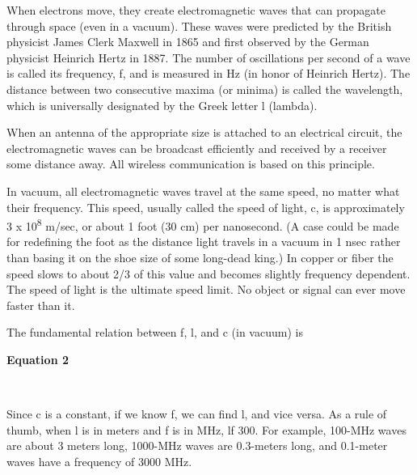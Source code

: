When electrons move, they create electromagnetic waves that can
propagate through space (even in a vacuum). These waves were predicted
by the British physicist James Clerk Maxwell in 1865 and first observed
by the German physicist Heinrich Hertz in 1887. The number of
oscillations per second of a wave is called its {frequency}, {f}, and is
measured in {Hz} (in honor of Heinrich Hertz). The distance between two
consecutive maxima (or minima) is called the {wavelength}, which is
universally designated by the Greek letter {l} (lambda).

When an antenna of the appropriate size is attached to an electrical
circuit, the electromagnetic waves can be broadcast efficiently and
received by a receiver some distance away. All wireless communication is
based on this principle.

In vacuum, all electromagnetic waves travel at the same speed, no matter
what their frequency. This speed, usually called the {speed of light},
{c}, is approximately 3 x 10\textsuperscript{8} m/sec, or about 1 foot
(30 cm) per nanosecond. (A case could be made for redefining the foot as
the distance light travels in a vacuum in 1 nsec rather than basing it
on the shoe size of some long-dead king.) In copper or fiber the speed
slows to about 2/3 of this value and becomes slightly frequency
dependent. The speed of light is the ultimate speed limit. No object or
signal can ever move faster than it.

The fundamental relation between {f}, {l}, and {c} (in vacuum) is

\textbf{\protect\hypertarget{0130661023_ch02lev1sec3.htmlux5cux23ch02eq02}{}{}
Equation 2}


~

Since {c} is a constant, if we know {f}, we can find {l}, and vice
versa. As a rule of thumb, when {l} is in meters and {f} is in MHz,
{l}{f}
 300. For example, 100-MHz waves are
about 3 meters long, 1000-MHz waves are 0.3-meters long, and 0.1-meter
waves have a frequency of 3000 MHz.

